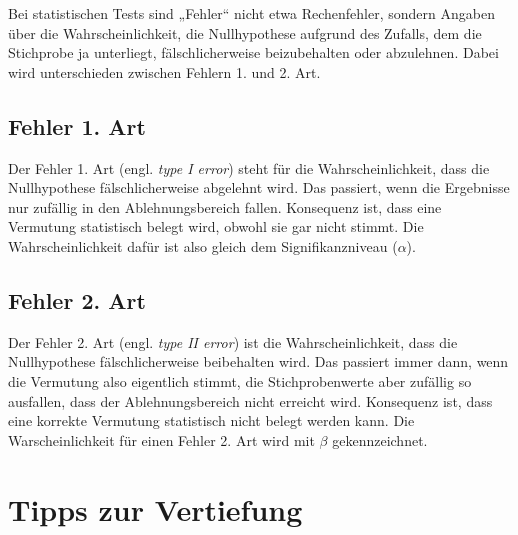 \documentclass[
  11pt,
  ngerman,
  a4paper,
]{report}
\begin{document}
Bei statistischen Tests sind „Fehler`` nicht etwa Rechenfehler, sondern Angaben über die Wahrscheinlichkeit, die Nullhypothese aufgrund des Zufalls, dem die Stichprobe ja unterliegt, fälschlicherweise beizubehalten oder abzulehnen. Dabei wird unterschieden zwischen Fehlern 1. und 2. Art.

\hypertarget{fehler-1.-art}{%
\subsection{Fehler 1. Art}\label{fehler-1.-art}}

Der Fehler 1. Art (engl. \emph{type I error}) steht für die Wahrscheinlichkeit, dass die Nullhypothese fälschlicherweise abgelehnt wird. Das passiert, wenn die Ergebnisse nur zufällig in den Ablehnungsbereich fallen. Konsequenz ist, dass eine Vermutung statistisch belegt wird, obwohl sie gar nicht stimmt. Die Wahrscheinlichkeit dafür ist also gleich dem Signifikanzniveau (\(\alpha\)).

\hypertarget{fehler-2.-art}{%
\subsection{Fehler 2. Art}\label{fehler-2.-art}}

Der Fehler 2. Art (engl. \emph{type II error}) ist die Wahrscheinlichkeit, dass die Nullhypothese fälschlicherweise beibehalten wird. Das passiert immer dann, wenn die Vermutung also eigentlich stimmt, die Stichprobenwerte aber zufällig so ausfallen, dass der Ablehnungsbereich nicht erreicht wird. Konsequenz ist, dass eine korrekte Vermutung statistisch nicht belegt werden kann. Die Warscheinlichkeit für einen Fehler 2. Art wird mit \(\beta\) gekennzeichnet.

\hypertarget{tipps-zur-vertiefung-5}{%
\section*{Tipps zur Vertiefung}\label{tipps-zur-vertiefung-5}}
\end{document}
